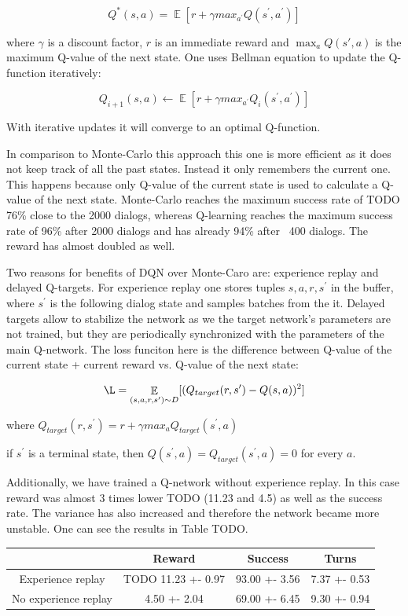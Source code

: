 \documentclass[12pt,titlepage,a4paper]{article}
\DeclareMathOperator*{\E}{\mathbb{E}}
\begin{document}
\[ Q^*(s,a) = \E [r + \gamma max_{a^\prime}Q(s^\prime,a^\prime)] \] 

where $\gamma$ is a discount factor,  $r$ is an immediate reward and $\max_a Q(s',a)$ is the maximum Q-value of the next state. One uses Bellman equation to update the Q-function iteratively:

\[Q_{i + 1} (s,a) \leftarrow \E[r + \gamma max_{a^\prime}Q_{i}(s^\prime,a^\prime)]\]

With iterative updates it will converge to an optimal Q-function.

In comparison to Monte-Carlo this approach this one is more efficient as it does not keep track of all the past states. Instead it only remembers the current one. This happens because only Q-value of the current state is used to calculate a Q-value of the next state. Monte-Carlo reaches the maximum success rate of TODO 76\% close to the 2000 dialogs, whereas Q-learning reaches the maximum success rate of 96\% after 2000 dialogs and has already 94\% after ~400 dialogs. The reward has almost doubled as well. 

Two reasons for benefits of DQN over Monte-Caro are: experience replay and delayed Q-targets. For experience replay one stores tuples ${s, a, r, s^\prime}$ in the buffer, where $s^\prime$ is the following dialog state and samples batches from the it. Delayed targets allow to stabilize the network as we the target network’s parameters are not trained, but they are periodically synchronized with the parameters of the main Q-network. The loss funciton here is the difference between Q-value of the current state + current reward vs. Q-value of the next state:

\[\L = \E_{(s, a, r, s^\prime) \sim D} [(Q_{target}(r,s^\prime) - Q(s, a))^2]\]

where $Q_{target}(r, s^\prime) = r + \gamma max_{a}Q_{target}(s^\prime,a)$

if $s^\prime$ is a terminal state, then $Q(s^\prime, a) = Q_{target}(s^\prime, a) = 0$ for every $a$.

Additionally, we have trained a Q-network without experience replay. In this case reward was almost 3 times lower TODO (11.23 and 4.5) as well as the success rate. The variance has also increased and therefore the network became more unstable. One can see the results in Table TODO.

\begin{center}
    \begin{tabular}{||c c c c||} 
     \hline
      & Reward & Success & Turns \\ [0.5ex] 
     \hline\hline
     Experience replay & TODO 11.23 +- 0.97 & 93.00 +- 3.56 & 7.37 +- 0.53 \\ 
     \hline
     No experience replay & 4.50 +- 2.04 & 69.00 +- 6.45 & 9.30 +- 0.94 \\
     \hline
    \end{tabular}
\end{center}
\end{document}
